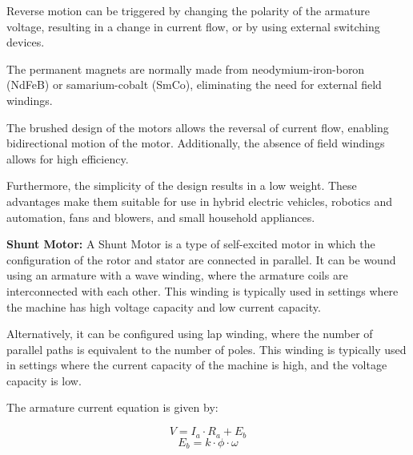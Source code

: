 \documentclass{article}
\begin{document}
\begin{flushleft}
Reverse motion can be triggered by changing the polarity of the armature voltage, resulting in a change in current flow, or by using external switching devices.

The permanent magnets are normally made from neodymium-iron-boron (NdFeB) or samarium-cobalt (SmCo), eliminating the need for external field windings.

The brushed design of the motors allows the reversal of current flow, enabling bidirectional motion of the motor. Additionally, the absence of field windings allows for high efficiency.

Furthermore, the simplicity of the design results in a low weight. These advantages make them suitable for use in hybrid electric vehicles, robotics and automation, fans and blowers, and small household appliances.
\newline
\vspace*{3pt}

\textbf{Shunt Motor:} A Shunt Motor is a type of self-excited motor in which the configuration of the rotor and stator are connected in parallel. It can be wound using an armature with a wave winding, where the armature coils are interconnected with each other. This winding is typically used in settings where the machine has high voltage capacity and low current capacity.\newline

Alternatively, it can be configured using lap winding, where the number of parallel paths is equivalent to the number of poles. This winding is typically used in settings where the current capacity of the machine is high, and the voltage capacity is low.\newline

The armature current equation is given by: \newline

\begin{equation*}
    V = I_a \cdot R_a + E_b
\end{equation*}
\begin{equation*}
    E_b = k \cdot \phi \cdot \omega
\end{equation*}




\end{flushleft}
\end{document}
